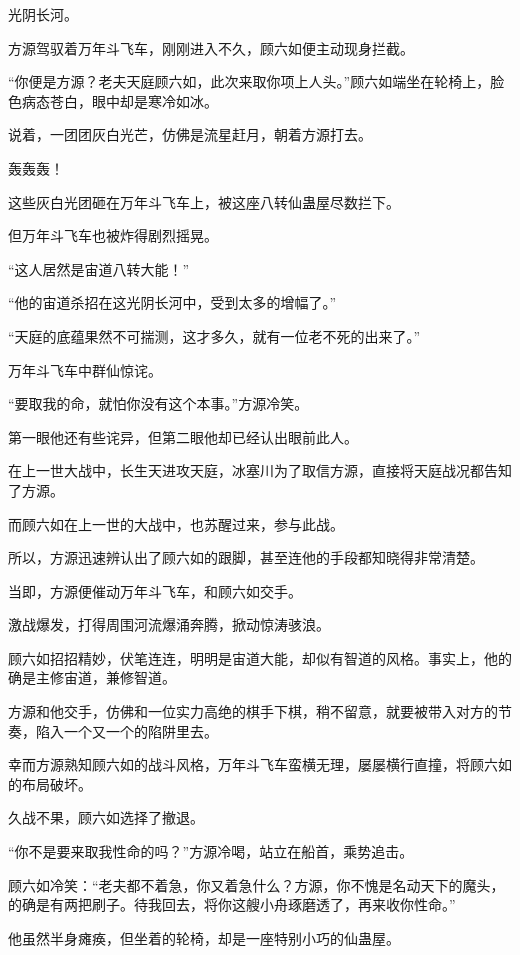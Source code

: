
\begin{this_body}

光阴长河。

方源驾驭着万年斗飞车，刚刚进入不久，顾六如便主动现身拦截。

“你便是方源？老夫天庭顾六如，此次来取你项上人头。”顾六如端坐在轮椅上，脸色病态苍白，眼中却是寒冷如冰。

说着，一团团灰白光芒，仿佛是流星赶月，朝着方源打去。

轰轰轰！

这些灰白光团砸在万年斗飞车上，被这座八转仙蛊屋尽数拦下。

但万年斗飞车也被炸得剧烈摇晃。

“这人居然是宙道八转大能！”

“他的宙道杀招在这光阴长河中，受到太多的增幅了。”

“天庭的底蕴果然不可揣测，这才多久，就有一位老不死的出来了。”

万年斗飞车中群仙惊诧。

“要取我的命，就怕你没有这个本事。”方源冷笑。

第一眼他还有些诧异，但第二眼他却已经认出眼前此人。

在上一世大战中，长生天进攻天庭，冰塞川为了取信方源，直接将天庭战况都告知了方源。

而顾六如在上一世的大战中，也苏醒过来，参与此战。

所以，方源迅速辨认出了顾六如的跟脚，甚至连他的手段都知晓得非常清楚。

当即，方源便催动万年斗飞车，和顾六如交手。

激战爆发，打得周围河流爆涌奔腾，掀动惊涛骇浪。

顾六如招招精妙，伏笔连连，明明是宙道大能，却似有智道的风格。事实上，他的确是主修宙道，兼修智道。

方源和他交手，仿佛和一位实力高绝的棋手下棋，稍不留意，就要被带入对方的节奏，陷入一个又一个的陷阱里去。

幸而方源熟知顾六如的战斗风格，万年斗飞车蛮横无理，屡屡横行直撞，将顾六如的布局破坏。

久战不果，顾六如选择了撤退。

“你不是要来取我性命的吗？”方源冷喝，站立在船首，乘势追击。

顾六如冷笑：“老夫都不着急，你又着急什么？方源，你不愧是名动天下的魔头，的确是有两把刷子。待我回去，将你这艘小舟琢磨透了，再来收你性命。”

他虽然半身瘫痪，但坐着的轮椅，却是一座特别小巧的仙蛊屋。


\end{this_body}

